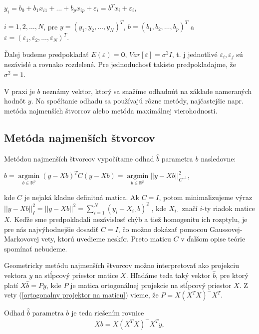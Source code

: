\begin{center}
$
y_i = b_0 + b_1 x_{i1} + … + b_p x_{ip} + {\varepsilon}_i = b^T x_i + {\varepsilon}_i
$,
\end{center}

$i = 1, 2, \ldots, N$,
pre $y = (y_1, y_2, \ldots, y_N)^T$, $b = (b_1, b_2, \ldots, b_p)^T$ a $\varepsilon = ({\varepsilon}_1, {\varepsilon}_2, \ldots, {\varepsilon}_N)^T$.

Ďalej budeme predpokladať $E(\varepsilon) = \textbf{0}$, $Var[\varepsilon] = {\sigma}^2 I$,
t. j jednotlivé ${\varepsilon}_i, {\varepsilon}_j$ sú nezávislé a rovnako rozdelené.
Pre jednoduchosť takisto predpokladajme, že ${\sigma}^2 = 1$.

V praxi je $b$ neznámy vektor, ktorý sa snažíme odhadnúť na základe nameraných hodnôt $y$.
Na spočítanie odhadu sa používajú rôzne metódy, najčastejšie napr. metóda najmenších štvorcov alebo metóda maximálnej vierohodnosti.

\subsection{Metóda najmenších štvorcov}

Metódou najmenších štvorcov vypočítame odhad $\hat{b}$ parametra $b$ nasledovne:

\begin{center}
$
\hat{b} = \underset{b \in \mathbb{R}^{p}}{\operatorname{arg min}} (y - Xb)^T C (y - Xb) =
\underset{b \in \mathbb{R}^{p}}{\operatorname{arg min}} ||y - Xb||_{C^{-1}}^2
$,
\end{center}

kde $C$ je nejaká kladne definitná matica. 
Ak $C = I$, potom minimalizujeme výraz
$||y - Xb||_I^2 = ||y - Xb||^2 = \sum_{i=1}^N (y_i - X_{i \cdot } b)^2$
, kde $X_{i \cdot }$ značí $i$-ty riadok matice $X$.
Keďže sme predpokladali nezávislosť chýb a tiež homogenitu ich rozptylu, je pre nás najvýhodnejšie dosadiť $C = I$,
čo možno dokázať pomocou Gaussovej-Markovovej vety, ktorú uvedieme neskôr.
Preto maticu $C$ v ďalšom opise teórie spomínať nebudeme.

Geometricky metódu najmenších štvorcov možno interpretovať ako projekciu vektora $y$ 
na stĺpcový priestor matice $X$. Hľadáme teda taký vektor $\hat{b}$, 
pre ktorý platí $X \hat{b} = Py$, kde $P$ je matica ortogonálnej projekcie na stĺpcový priestor $X$. 
Z vety (\ref{ortogonalny projektor na maticu}) vieme, že $P = X (X^T X)^- X^T$.

Odhad $\hat{b}$ parametra $b$ je teda riešením rovnice
\begin{align}
\label{least squares solution}
X b =  X (X^T X)^- X^T y,
\end{align}

